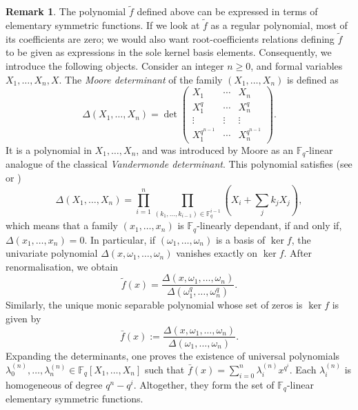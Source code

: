 \documentclass[11pt]{article}
\theoremstyle{definition}
\newtheorem{remark}[theorem]{Remark}
\renewcommand{\tilde}{\widetilde}
\renewcommand\geq{\geqslant}
\newcommand\Fq{\mathbb{F}_q}
\begin{document}
\begin{remark}
  The polynomial $\tilde f$ defined above can be expressed in
  terms of elementary symmetric functions. If we look at $\tilde f$ as a
  regular polynomial, most of its coefficients are zero; we would also want
  root-coefficients relations defining $\tilde f$ to be given as expressions in
  the sole kernel basis elements. Consequently, we introduce the following
  objects. Consider an integer $n \geq 0$, and formal variables $X_1, \dots,
  X_n, X$. The \emph{Moore determinant} of the family $(X_1, \dots, X_n)$ is
  defined as
  \[
    \Delta(X_1, \dots, X_n) = \det
    \begin{pmatrix}
      X_1 & \cdots & X_n \\
      X_1^q & \cdots & X_n^q \\
      \vdots & \vdots & \vdots \\
      X_1^{q^{n-1}} & \cdots & X_n^{q^{n-1}}
    \end{pmatrix}.
  \]
  It is a polynomial in $X_1, \dots, X_n$, and was introduced by Moore
  \cite{moore_two-fold_1896} as an $\Fq$-linear analogue of the classical
  \emph{Vandermonde determinant}. This polynomial satisfies (see \cite[Theorem~10]{ore_special_1933} or
  \cite[Proposition~1]{elkies_linearized_1999})
  \[
    \Delta(X_1, \dots, X_n) =
    \prod_{i=1}^n
      \prod_{(k_1, \dots, k_{i-1}) \in \Fq^{i-1}}
        \left(X_i + \sum_j k_j X_j\right),
  \]
  which means that a family $(x_1, \dots, x_n)$ is $\Fq$-linearly dependant, if and only if, $\Delta(x_1, \dots, x_n)=0$. 
  In particular, if $(\omega_1, \dots, \omega_n)$ is a basis of $\ker f$,
  the univariate polynomial $\Delta(x, \omega_1, \ldots, \omega_n)$ vanishes exactly 
  on $\ker f$. After renormalisation, we obtain
  \[
    \tilde f(x) = \frac {\Delta(x, \omega_1, \dots, \omega_n)}
                          {\Delta(\omega_1^q, \dots, \omega_n^q)}.
  \]
  Similarly, the unique monic separable polynomial whose set of zeros is $\ker f$
  is given by
  \[
    \bar{f}(x) := \frac {\Delta(x, \omega_1, \dots, \omega_n)}
                          {\Delta(\omega_1, \dots, \omega_n)}.
  \]
  Expanding the determinants, one proves the existence of universal
  polynomials $\lambda^{(n)}_0, \dots, \lambda^{(n)}_n \in
  \Fq[X_1, \dots, X_n]$ such that $\bar f(x) = \sum_{i=0}^n \lambda^{(n)}_i x^{q^i}$.
  Each $\lambda^{(n)}_i$ is homogeneous of degree $q^n - q^i$.
  Altogether, they form the set of $\Fq$-linear elementary symmetric functions.
\end{remark}
\end{document}
